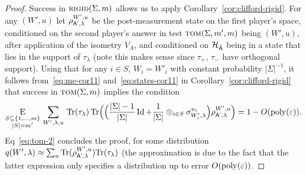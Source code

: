 \begin{proof}
Success in $\textsc{rigid}(\Sigma,m)$ allows us to apply Corollary~\ref{cor:clifford-rigid}. For any $(W',u)$ let $\rho_{{\textsf{A'}},\lambda}^{W',u}$ be the post-measurement state on the first player's space, conditioned on the second player's answer  in test $\textsc{tom}(\Sigma,m',m)$ being $(W',u)$, after application of the isometry $V_A$, and conditioned on $\mathcal{H}_{\hat{{\textsf{A}}}}$ being in a state that lies in the support of $\tau_\lambda$ (note this makes sense since $\tau_+$, $\tau_-$ have orthogonal support). 
Using that for any $i\in S$, $W_i=W'_i$ with constant probability $|\Sigma|^{-1}$, 
it follows from~\eqref{eq:me-cor11} and~\eqref{eq:states-cor11} in Corollary~\ref{cor:clifford-rigid} that success in $\textsc{tom}(\Sigma,m)$ implies the condition
\begin{equation}\label{eq:tom-2}
\mathop{\textsc{E}}_{\substack{S\subseteq \{1,\ldots,m\}\\|S|=m'}}\, \sum_{W',\lambda,u}\,\mbox{\rm Tr}(\tau_\lambda)  \,\mbox{\rm Tr}\Big(\Big( \frac{|\Sigma|-1}{|\Sigma|}\mathop{\rm Id}\nolimits + \frac{1}{|\Sigma|}\otimes_{i\in S}\sigma_{W'_i,\lambda}^{u_i} \Big) \rho_{{\textsf{A'}},\lambda}^{W',u}\Big)  = 1- O(\operatorname{poly}(\varepsilon)). 
\end{equation}
Eq~\eqref{eq:tom-2} concludes the proof, for some distribution $q(W',\lambda) \approx \sum_u \mbox{\rm Tr}(\rho_{{\textsf{A'}},\lambda}^{W',u})\mbox{\rm Tr}(\tau_\lambda)$ (the approximation is due to the fact that the latter expression only specifies a distribution up to error $O(\operatorname{poly}(\varepsilon))$.
\end{proof}



